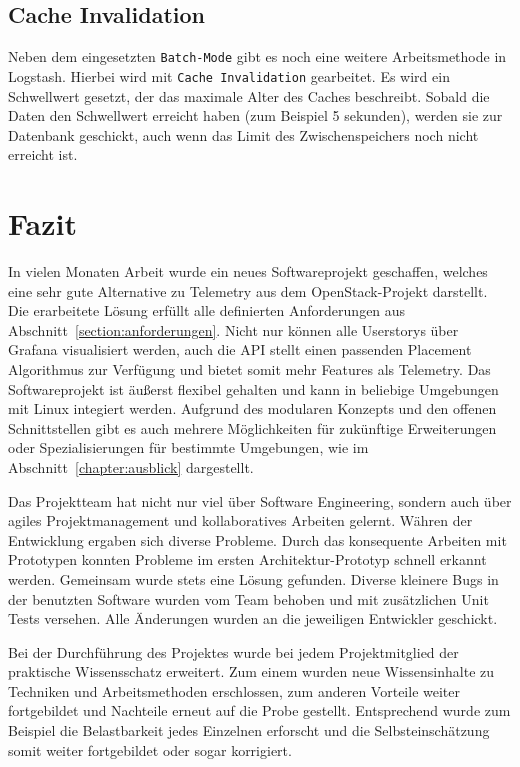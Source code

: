 \section{Cache Invalidation}
Neben dem eingesetzten \texttt{Batch-Mode} gibt es noch eine weitere
Arbeitsmethode in Logstash. Hierbei wird mit \texttt{Cache Invalidation}
gearbeitet. Es wird ein Schwellwert gesetzt, der das maximale Alter des Caches
beschreibt. Sobald die Daten den Schwellwert erreicht haben (zum Beispiel 5
sekunden), werden sie zur Datenbank geschickt, auch wenn das Limit des
Zwischenspeichers noch nicht erreicht ist.
\tm%

\chapter{Fazit}
In vielen Monaten Arbeit wurde ein neues Softwareprojekt geschaffen, welches
eine sehr gute Alternative zu Telemetry aus dem OpenStack-Projekt darstellt.
Die erarbeitete Lösung erfüllt alle definierten Anforderungen aus
Abschnitt~\ref{section:anforderungen}. Nicht nur können alle Userstorys über
Grafana visualisiert werden, auch die \gls{API} stellt einen passenden
Placement Algorithmus zur Verfügung und bietet somit mehr Features als
Telemetry. Das Softwareprojekt ist äußerst flexibel gehalten und kann in
beliebige Umgebungen mit Linux  integiert
werden. Aufgrund des modularen Konzepts und den offenen Schnittstellen gibt es
auch mehrere Möglichkeiten für zukünftige Erweiterungen oder Spezialisierungen
für bestimmte Umgebungen, wie im Abschnitt~\ref{chapter:ausblick} dargestellt.

Das Projektteam hat nicht nur viel über Software Engineering, sondern auch über
agiles Projektmanagement und kollaboratives Arbeiten gelernt. Währen der
Entwicklung ergaben sich diverse Probleme. Durch das konsequente Arbeiten mit
Prototypen konnten Probleme im ersten Architektur\hyp{}Prototyp schnell erkannt
werden. Gemeinsam wurde stets eine Lösung gefunden. Diverse kleinere Bugs in
der benutzten Software wurden vom Team behoben und mit zusätzlichen Unit Tests
versehen. Alle Änderungen wurden an die jeweiligen Entwickler geschickt.

Bei der Durchführung des Projektes wurde bei jedem Projektmitglied der
praktische Wissensschatz erweitert. Zum einem wurden neue Wissensinhalte zu
Techniken und Arbeitsmethoden erschlossen, zum anderen Vorteile weiter
fortgebildet und Nachteile erneut auf die Probe gestellt. Entsprechend wurde
zum Beispiel die Belastbarkeit jedes Einzelnen erforscht und die
Selbsteinschätzung somit weiter fortgebildet oder sogar korrigiert.
\all%

